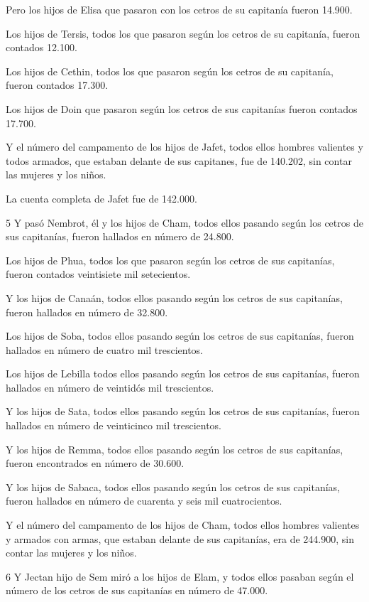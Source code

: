 Pero los hijos de Elisa que pasaron con los cetros de su capitanía fueron 14.900.

Los hijos de Tersis, todos los que pasaron según los cetros de su capitanía, fueron contados 12.100.

Los hijos de Cethin, todos los que pasaron según los cetros de su capitanía, fueron contados 17.300.

Los hijos de Doin que pasaron según los cetros de sus capitanías fueron contados 17.700.

Y el número del campamento de los hijos de Jafet, todos ellos hombres valientes y todos armados, que estaban delante de sus capitanes, fue de 140.202, sin contar las mujeres y los niños.

\par La cuenta completa de Jafet fue de 142.000.

\par 5 Y pasó Nembrot, él y los hijos de Cham, todos ellos pasando según los cetros de sus capitanías, fueron hallados en número de 24.800.

Los hijos de Phua, todos los que pasaron según los cetros de sus capitanías, fueron contados veintisiete mil setecientos.

Y los hijos de Canaán, todos ellos pasando según los cetros de sus capitanías, fueron hallados en número de 32.800.

Los hijos de Soba, todos ellos pasando según los cetros de sus capitanías, fueron hallados en número de cuatro mil trescientos.

Los hijos de Lebilla todos ellos pasando según los cetros de sus capitanías, fueron hallados en número de veintidós mil trescientos.

Y los hijos de Sata, todos ellos pasando según los cetros de sus capitanías, fueron hallados en número de veinticinco mil trescientos.

Y los hijos de Remma, todos ellos pasando según los cetros de sus capitanías, fueron encontrados en número de 30.600.

Y los hijos de Sabaca, todos ellos pasando según los cetros de sus capitanías, fueron hallados en número de cuarenta y seis mil cuatrocientos.

Y el número del campamento de los hijos de Cham, todos ellos hombres valientes y armados con armas, que estaban delante de sus capitanías, era de 244.900, sin contar las mujeres y los niños.

\par 6 Y Jectan hijo de Sem miró a los hijos de Elam, y todos ellos pasaban según el número de los cetros de sus capitanías en número de 47.000.


